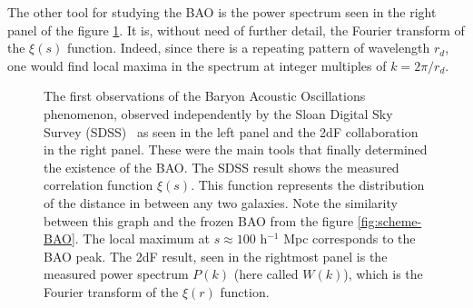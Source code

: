 The other tool for studying the BAO is the power spectrum seen in the right panel of the figure \ref{fig:2005-results}. It is, without need of further detail, the Fourier transform of the $\xi(s)$ function. Indeed, since there is a repeating pattern of wavelength $r_d$, one would find local maxima in the spectrum at integer multiples of $k = 2\pi /r_d$. \\

\begin{figure}[t] \centering
	\hspace{0.2pt}
	\caption[First BAO observations by the SDSS and the 2dF groups]{The first observations of the Baryon Acoustic Oscillations phenomenon, observed independently by the Sloan Digital Sky Survey (SDSS)~\cite{Eisenstein2005} as seen in the left panel and the 2dF collaboration~\cite{2dFCole2005} in the right panel. These were the main tools that finally determined the existence of the BAO. The SDSS result shows the measured correlation function $\xi(s)$. This function represents the distribution of the distance in between any two galaxies. Note the similarity between this graph and the frozen BAO from the figure \ref{fig:scheme-BAO}. The local maximum at $s\approx 100$ h$^{-1}$ Mpc corresponds to the BAO peak. The 2dF result, seen in the rightmost panel is the measured power spectrum $P(k)$ (here called  $W(k)$), which is the Fourier transform of the $\xi(r)$ function.}
	\label{fig:2005-results}
\end{figure}


